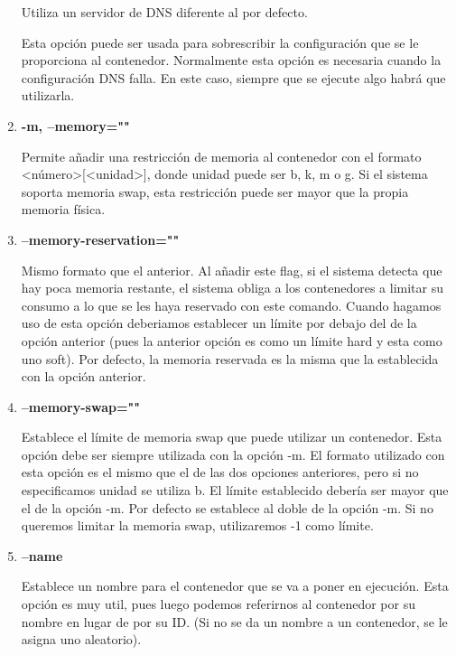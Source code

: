 \documentclass[]{article}
\begin{document}
\begin{enumerate}
			Utiliza un servidor de DNS diferente al por defecto.
	
			Esta opción puede ser usada para sobrescribir la configuración que se le proporciona al contenedor.
			Normalmente esta opción es necesaria cuando la configuración DNS falla. En este caso, siempre que se ejecute algo habrá que utilizarla.
	
\item {\bf -m, --memory=""}
	
			Permite añadir una restricción de memoria al contenedor con el formato <número>[<unidad>], donde unidad puede ser b, k, m o g.
			Si el sistema soporta memoria swap, esta restricción puede ser mayor que la propia memoria física.
	
\item {\bf --memory-reservation=""}
	
			Mismo formato que el anterior.
			Al añadir este flag, si el sistema detecta que hay poca memoria restante, el sistema obliga a los contenedores a limitar su consumo a
			lo que se les haya reservado con este comando.
			Cuando hagamos uso de esta opción deberiamos establecer un límite por debajo del de la opción anterior (pues la anterior opción es como
			un límite hard y esta como uno soft). Por defecto, la memoria reservada es la misma que la establecida con la opción anterior.
	
\item {\bf --memory-swap=""}
	
			Establece el límite de memoria swap que puede utilizar un contenedor. Esta opción debe ser siempre utilizada con la opción -m.
			El formato utilizado con esta opción es el mismo que el de las dos opciones anteriores, pero si no especificamos unidad se utiliza b.
			El límite establecido debería ser mayor que el de la opción -m.
			Por defecto se establece al doble de la opción -m.
			Si no queremos limitar la memoria swap, utilizaremos -1 como límite.
	
\item {\bf --name}
	
			Establece un nombre para el contenedor que se va a poner en ejecución. Esta opción es muy util, pues luego podemos referirnos al contenedor por su nombre en lugar de por su ID.
			(Si no se da un nombre a un contenedor, se le asigna uno aleatorio).


\end{enumerate}
\end{document}
